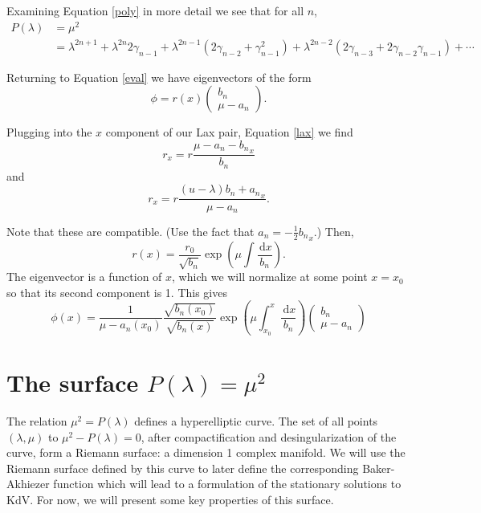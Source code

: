 \documentclass[12pt, a4paper]{article}
\newcommand{\ud}{\,\mathrm{d}}
\begin{document}
Examining Equation \eqref{poly} in more detail we see that for all $n$,
\begin{align*}
  P(\lambda)
  &=
  \mu^2 \\
  &=
  \lambda^{2n+1} + \lambda^{2n} 2 \gamma_{n-1} + \lambda^{2n-1}
  \left( 2 \gamma_{n-2} + \gamma_{n-1}^2 \right) + \lambda^{2n-2}
  \left( 2\gamma_{n-3} + 2\gamma_{n-2}\gamma_{n-1} \right) + \cdots
\end{align*}

Returning to Equation \eqref{eval} we have eigenvectors of the form
\[
  \phi = r(x) \left(
  \begin{array}{c}
    b_n \\ \mu - a_n
  \end{array}
  \right).
\]

Plugging into the $x$ component of our Lax pair, Equation \eqref{lax} we
find
\[
  r_x = r \frac{\mu - a_n - {b_n}_x}{b_n}
\]
and
\[
  r_x = r \frac{(u-\lambda) b_n + {a_n}_x}{\mu - a_n}.
\]

Note that these are compatible. (Use the fact that $a_n =
-\frac{1}{2}{b_n}_x$.) Then,
\[
  r(x) = \frac{r_0}{\sqrt{b_n}}
         \exp\left( \mu \int \frac{\ud x}{b_n} \right).
\]
The eigenvector is a function of $x$, which we will normalize at some
point $x = x_0$ so that its second component is 1. This gives
\begin{equation}
  \phi(x)
  =
  \frac{1}{\mu-a_n(x_0)}
  \frac{\sqrt{b_n(x_0)}}{\sqrt{b_n(x)}}
  \exp \left(
    \mu \int_{x_0}^x \frac{\ud x}{b_n}
    \right)
    \left(
    \begin{array}{c} b_n \\ \mu - a_n \end{array}
    \right)
\end{equation}



\section{The surface $P(\lambda) = \mu^2$}



The relation $\mu^2 = P(\lambda)$ defines a hyperelliptic curve. The set
of all points $(\lambda,\mu)$ to $\mu^2 - P(\lambda) = 0$, after
compactification and desingularization of the curve, form a Riemann
surface: a dimension 1 complex manifold. We will use the Riemann surface
defined by this curve to later define the corresponding Baker-Akhiezer
function which will lead to a formulation of the stationary solutions to
KdV. For now, we will present some key properties of this surface. \\
\end{document}
